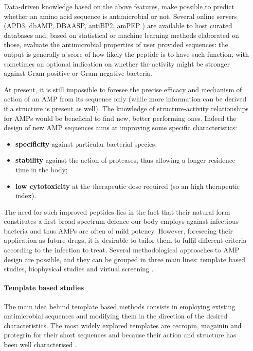 %
Data-driven knowledge based on the above features, make possible to predict whether an amino acid sequence is antimicrobial or not. Several online servers (APD3, dbAMP, DBAASP, antiBP2, amPEP \cite
{APD3,DBAASP2,dbAMP,antiBP2,amPEP}) are available to host curated databases and, based on statistical or machine learning methods elaborated on those, evaluate the antimicrobial properties of user provided sequences: the output is generally a score of how likely the peptide is to have such function, with sometimes an optional indication on whether the activity might be stronger against Gram-positive or Gram-negative bacteria.

At present, it is still impossible to foresee the precise efficacy and mechanism of action of an AMP from its sequence only (while more information can be derived if a structure is present as well). 
%
The knowledge of structure-activity relationships for AMPs would be beneficial to find new, better performing ones. Indeed the design of new AMP sequences aims at improving some specific characteristics:
\begin{itemize}
\item \textbf{specificity} against particular bacterial species;
\item \textbf{stability} against the action of proteases, thus allowing a longer residence time in the body;
\item \textbf{low cytotoxicity} at the therapeutic dose required (so an high therapeutic index).
\end{itemize}
The need for such improved peptides lies in the fact that their natural form constitutes a first broad spectrum defence our body employs against infectious bacteria and thus AMPs are often of mild potency. However, foreseeing their application as future drugs, it is desirable to tailor them to fulfil different criteria according to the infection to treat.
%
Several methodological approaches to AMP design are possible, and they can be grouped in three main lines: template based studies, biophysical studies and virtual screening \cite{Fjell2011}.


\paragraph{Template based studies}
The main idea behind template based methods consists in employing existing antimicrobial sequences and modifying them in the direction of the desired characteristics. The most widely explored templates are cecropin, magainin and protegrin for their short sequences and because their action and structure has been well characterised \cite{Wiradharma2011,Huang2010,Pag2008,Wang2015}.

